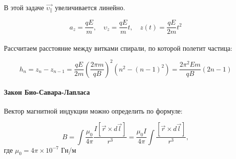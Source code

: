 \documentclass[dvipdfmx]{article}
\begin{document}
\paragraph{}

В этой задаче $\vec{\upsilon_\parallel}$ увеличивается линейно.

\begin{equation*}
  a_z = \frac{qE}{m}, \quad \upsilon_z = \frac{qE}{m}t, \quad z(t) = \frac{qE}{2m}t^2
\end{equation*}

\paragraph{}

\newpage

Рассчитаем расстояние между витками спирали, по которой полетит частица:

\begin{equation*}
  h_n = z_n - z_{n-1} = \frac{qE}{2m}\left(\frac{2\pi m}{qB}\right)^2\left(n^2-(n-1)^2\right) = \frac{2\pi^2Em}{qB}(2n-1)
\end{equation*}

\paragraph{Закон Био-Савара-Лапласа} Вектор магнитной индукции можно определить по формуле:

\begin{equation*}
  B = \int \frac{\mu_0}{4\pi} \frac{ I[\vec{r} \times d \vec{l}] }{r^3} =
  \frac{\mu_0I}{4\pi}\int\frac{[\vec{r}\times d\vec{l}]}{r^3},
\end{equation*}
где $\mu_0 = 4\pi \times 10^{-7}$ Гн/м
\end{document}
